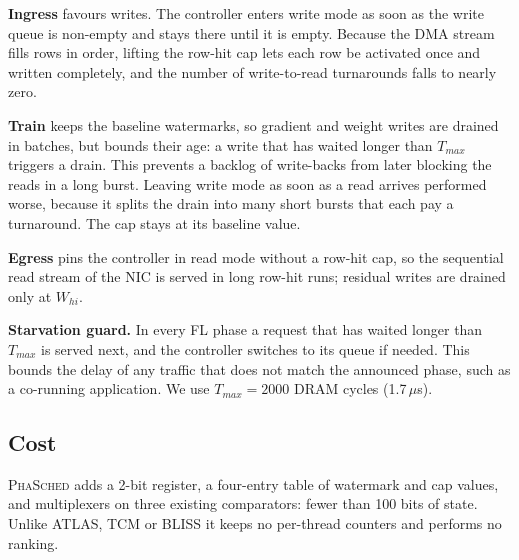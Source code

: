 \documentclass[conference]{IEEEtran}
\newcommand{\name}{\textsc{PhaSched}}
\begin{document}
\textbf{Ingress} favours writes. The controller enters write mode as soon as the write queue is non-empty and stays there until it is empty. Because the DMA stream fills rows in order, lifting the row-hit cap lets each row be activated once and written completely, and the number of write-to-read turnarounds falls to nearly zero.

\textbf{Train} keeps the baseline watermarks, so gradient and weight writes are drained in batches, but bounds their age: a write that has waited longer than $T_{max}$ triggers a drain. This prevents a backlog of write-backs from later blocking the reads in a long burst. Leaving write mode as soon as a read arrives performed worse, because it splits the drain into many short bursts that each pay a turnaround. The cap stays at its baseline value.

\textbf{Egress} pins the controller in read mode without a row-hit cap,
 so the sequential read stream of the NIC is served in long row-hit runs; residual writes are drained only at $W_{hi}$.

\textbf{Starvation guard.} In every FL phase a request that has waited longer than $T_{max}$ is served next, and the controller switches to its queue if needed. This bounds the delay of any traffic that does not match the announced phase, such as a co-running application. We use $T_{max}=2000$ DRAM cycles (1.7\,$\mu$s).

\subsection{Cost}
\name{} adds a 2-bit register, a four-entry table of watermark and cap values, and multiplexers on three existing comparators: fewer than 100 bits of state. Unlike ATLAS, TCM or BLISS it keeps no per-thread counters and performs no ranking.
\end{document}
